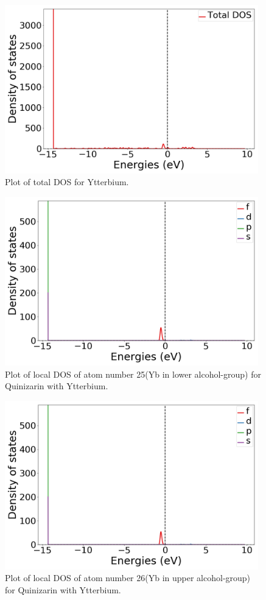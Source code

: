 \documentclass{article}
\begin{document}
  \begin{figure}[H]
      \centering
      \includegraphics[width = 11cm]{../fig/Yb_TDOS_1.png}
      \caption{Plot of total DOS for Ytterbium. }
      \label{fig:Yb_TDOS_1}
  \end{figure}

  \begin{figure}[H]
      \centering
      \includegraphics[width = 11cm]{../fig/Yb_LDOS25_1.png}
      \caption{Plot of local DOS of atom number 25(Yb in lower alcohol-group) for Quinizarin with Ytterbium. }
      \label{fig:Yb_LDOS25_1}
  \end{figure}

  \begin{figure}[H]
      \centering
      \includegraphics[width = 11cm]{../fig/Yb_LDOS26_1.png}
      \caption{Plot of local DOS of atom number 26(Yb in upper alcohol-group) for Quinizarin with Ytterbium. }
      \label{fig:Yb_LDOS26_1}
  \end{figure}


\end{document}

